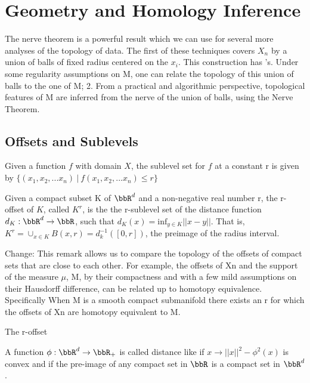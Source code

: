 \section{Geometry and Homology Inference}
The nerve theorem is a powerful result which we can use for several more analyses of the topology of data. The first of these techniques covers $X_n$ by a union of balls of fixed radius centered on the $x_i$. This construction has 
’s. Under some regularity
assumptions on M, one can relate the topology of this union of balls to the one of M;
2. From a practical and algorithmic perspective, topological features of M are inferred from
the nerve of the union of balls, using the Nerve Theorem.


\subsection{Offsets and Sublevels} 

\begin{definition}
Given a function $f$ with domain $X$, the sublevel set for $f$ at a constant r is given by $\{(x_1, x_2, ... x_n) \: | \: f(x_1, x_2, ... x_n) \leq r\}$
\end{definition}

\begin{definition}[r-offset]
Given a compact subset K of $\bbR^d$ and a non-negative
real number r, the r-offset of $K$, called $K^r$, is the the r-sublevel set of the distance function $d_K:\bbR^d \rightarrow \bbR$, such that $d_K(x) = \text{inf}_{y\in K}||x-y||$. That is, $K^r = \cup_{x\in{K}}B(x, r) = d_{k}^{-1}([0, r])$, the preimage of the radius interval.
\end{definition}


Change:
This remark allows us to compare the topology of the offsets of compact sets that are close to each other. For example, the offsets of Xn and the support of the measure $\mu$, M, by their compactness and with a few mild assumptions on their Hausdorff difference, can be related up to homotopy equivalence. Specifically When M is a smooth compact submanifold there exists an r for which the offsets of Xn are homotopy equivalent to M.


The r-offset 

\begin{definition}
A function $\phi:\bbR^d \rightarrow \bbR_+$ is called distance like if $x\rightarrow ||x||^2 -\phi^2(x)$ is convex and if the pre-image of any compact set in $\bbR$ is a compact set in $\bbR^d$. 
\end{definition}



